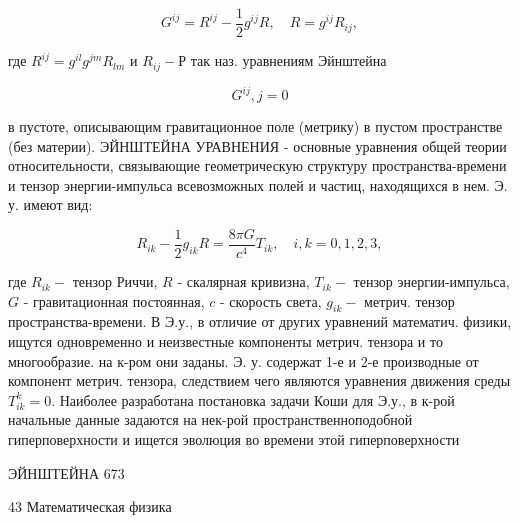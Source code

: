 \documentclass[10pt]{article}
\begin{document}
\[

G^{i j}=R^{i j}-\frac{1}{2} g^{i j} R, \quad R=g^{i j} R_{i j},

\]



где $R^{i j}=g^{i l} g^{j m} R_{l m}$ и $R_{i j}-Р$ так наз. уравнениям Эйнштейна



\[

G^{i j}, j=0

\]



в пустоте, описывающим гравитационное поле (метрику) в пустом пространстве (без материи). ЭЙНШТЕЙНА УРАВНЕНИЯ - основные уравнения общей теории относительности, связывающие геометрическую структуру пространства-времени и тензор энергии-импульса всевозможных полей и частиц, находящихся в нем. Э. у. имеют вид:



\[

R_{i k}-\frac{1}{2} g_{i k} R=\frac{8 \pi G}{c^{4}} T_{i k}, \quad i, k=0,1,2,3,

\]



где $R_{i k}-$ тензор Риччи, $R$ - скалярная кривизна, $T_{i k}-$ тензор энергии-импульса, $G$ - гравитационная постоянная, $c$ - скорость света, $g_{i k}-$ метрич. тензор пространства-времени. В Э.у., в отличие от других уравнений математич. физики, ищутся одновременно и неизвестные компоненты метрич. тензора и то многообразие. на к-ром они заданы. Э. у. содержат 1-е и 2-е производные от компонент метрич. тензора, следствием чего являются уравнения движения среды $T_{i k}^{k}=0$. Наиболее разработана постановка задачи Коши для Э.у., в к-рой начальные данные задаются на нек-рой пространственноподобной гиперповерхности и ищется эволюция во времени этой гиперповерхности



ЭЙНШТЕЙНА 673



43 Математическая физика
\end{document}
